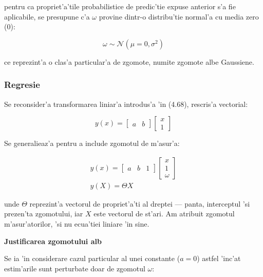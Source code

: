 \documentclass[12pt,a4paper,twoside]{report}
\begin{document}
pentru ca propriet'a'tile probabilistice de predic'tie expuse anterior s'a fie aplicabile, se presupune c'a $\omega$ provine dintr-o distribu'tie normal'a cu media zero ($0$):

\begin{equation}
    \omega \sim  \mathcal{N}(\mu =0, \sigma^2)
\end{equation}

ce reprezint'a o clas'a particular'a de zgomote, numite zgomote albe Gaussiene.

\subsubsection{Regresie}

Se reconsider'a transformarea liniar'a introdus'a 'in (4.68), rescris'a vectorial: 

\begin{equation}
    y(x) = \begin{bmatrix}
a & b \end{bmatrix} \begin{bmatrix} x \\ 1 \end{bmatrix} 
\end{equation}

Se generalieaz'a pentru a include zgomotul de m'asur'a:

\begin{gather}
    y(x) = \begin{bmatrix}
    a & b & 1 \end{bmatrix} \begin{bmatrix} x \\ 1 \\ \omega \end{bmatrix} \\
    y(X) = \Theta X 
\end{gather}

unde $\Theta$ reprezint'a vectorul de propriet'a'ti al dreptei --- panta, interceptul  \cite{LinReg} 'si prezen'ta zgomotului, iar $X$ este vectorul de st'ari. Am atribuit zgomotul m'asur'atorilor, 'si nu ecua'tiei liniare 'in sine.

\vspace{5px}

\textbf{Justificarea zgomotului alb}

\vspace{5px}

Se ia 'in considerare cazul particular al unei constante ($a = 0$) astfel 'inc'at estim'arile sunt perturbate doar de zgomotul $\omega$:
\end{document}
